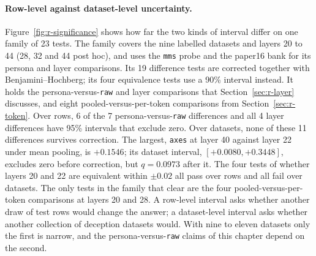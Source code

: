 \paragraph{Row-level against dataset-level uncertainty.}
Figure~\ref{fig:r-significance} shows how far the two kinds of interval differ on one family of 23 tests. %
The family covers the nine labelled datasets and layers 20 to 44 (28, 32 and 44 post hoc), and uses the \texttt{mms} probe and the paper16 bank for its persona and layer comparisons. %
Its 19 difference tests are corrected together with Benjamini--Hochberg; its four equivalence tests use a 90\% interval instead. %
It holds the persona-versus-\texttt{raw} and layer comparisons that Section~\ref{sec:r-layer} discusses, and eight pooled-versus-per-token comparisons from Section~\ref{sec:r-token}.
Over rows, 6 of the 7 persona-versus-\texttt{raw} differences and all 4 layer differences have 95\% intervals that exclude zero. %
Over datasets, none of these 11 differences survives correction. %
The largest, \texttt{axes} at layer 40 against layer 22 under mean pooling, is $+0.1546$; its dataset interval, $[+0.0080, +0.3448]$, excludes zero before correction, but $q=0.0973$ after it. %
The four tests of whether layers 20 and 22 are equivalent within $\pm0.02$ all pass over rows and all fail over datasets. %
The only tests in the family that clear are the four pooled-versus-per-token comparisons at layers 20 and 28. %
A row-level interval asks whether another draw of test rows would change the answer; a dataset-level interval asks whether another collection of deception datasets would. %
With nine to eleven datasets only the first is narrow, and the persona-versus-\texttt{raw} claims of this chapter depend on the second. %

